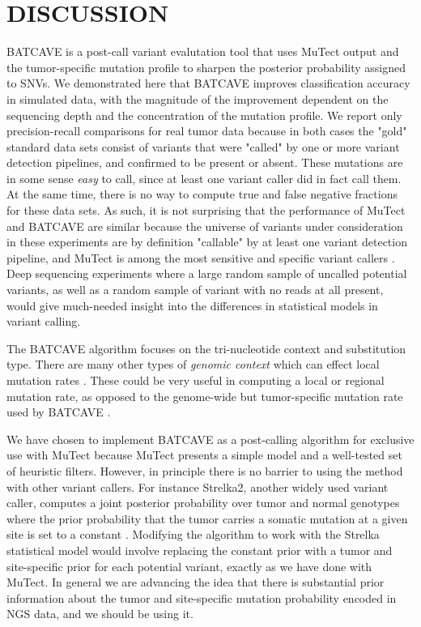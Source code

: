 \documentclass[a4,center,fleqn]{NAR}
\newcommand{\batcave}{BATCAVE }
\begin{document}
\section{DISCUSSION}

\batcave is a post-call variant evalutation tool that uses MuTect output and the tumor-specific mutation profile to sharpen the posterior probability assigned to SNVs.
We demonstrated here that \batcave improves classification accuracy in simulated data, with the magnitude of the improvement dependent on the sequencing depth and the concentration of the mutation profile.
We report only precision-recall comparisons for real tumor data because in both cases the "gold" standard data sets consist of variants that were "called" by one or more variant detection pipelines, and confirmed to be present or absent.
These mutations are in some sense \textit{easy} to call, since at least one variant caller did in fact call them.
At the same time, there is no way to compute true and false negative fractions for these data sets.
As such, it is not surprising that the performance of MuTect and \batcave are similar because the universe of variants under consideration in these experiments are by definition "callable" by at least one variant detection pipeline, and MuTect is among the most sensitive and specific variant callers \cite{Griffith2015,Cibulskis2013}.
Deep sequencing experiments where a large random sample of uncalled potential variants, as well as a random sample of variant with no reads at all present, would give much-needed insight into the differences in statistical models in variant calling.

The \batcave algorithm focuses on the tri-nucleotide context and substitution type. 
There are many other types of \textit{genomic context} which can effect local mutation rates \cite{Buisson2019}.
These could be very useful in computing a local or regional mutation rate, as opposed to the genome-wide but tumor-specific mutation rate used by \batcave.

We have chosen to implement \batcave as a post-calling algorithm for exclusive use with MuTect because MuTect presents a simple model and a well-tested set of heuristic filters.
However, in principle there is no barrier to using the method with other variant callers.
For instance Strelka2, another widely used variant caller, computes a joint posterior probability over tumor and normal genotypes where the prior probability that the tumor carries a somatic mutation at a given site is set to a constant \cite{Kim2018}.
Modifying the algorithm to work with the Strelka statistical model would involve replacing the constant prior with a tumor and site-specific prior for each potential variant, exactly as we have done with MuTect.
In general we are advancing the idea that there is substantial prior information about the tumor and site-specific mutation probability encoded in NGS data, and we should be using it.
\end{document}
